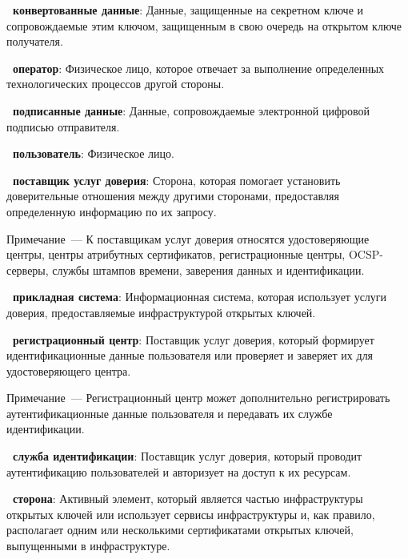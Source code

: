 {\bf \thedefctr~конвертованные данные}:
Данные, защищенные на секретном ключе и сопровождаемые этим ключом, 
защищенным в свою очередь на открытом ключе получателя.  

{\bf \thedefctr~оператор}:
Физическое лицо, которое отвечает за выполнение определенных 
технологических процессов другой стороны.

{\bf \thedefctr~подписанные данные}:
Данные, сопровождаемые электронной цифровой подписью отправителя. 

{\bf\thedefctr~пользователь}: 
Физическое лицо.

{\bf\thedefctr~поставщик услуг доверия}:
Сторона, которая помогает установить доверительные отношения между другими 
сторонами, предоставляя определенную информацию по их запросу.

\begin{note}
Примечание~--- К поставщикам услуг доверия относятся удостоверяющие 
центры, центры атрибутных сертификатов, регистрационные центры, 
OCSP-серверы, службы штампов времени, заверения данных и идентификации.
\end{note}

{\bf\thedefctr~прикладная система}:
Информационная система, которая использует услуги доверия,
предоставляемые инфраструктурой открытых ключей.
%

{\bf\thedefctr~регистрационный центр}: 
Поставщик услуг доверия, который формирует идентификационные данные 
пользователя или проверяет и заверяет их для удостоверяющего центра.

\begin{note}
Примечание~--- Регистрационный центр может дополнительно регистрировать 
аутентификационные данные пользователя и передавать их службе 
идентификации.
\end{note}

{\bf\thedefctr~служба идентификации}: 
Поставщик услуг доверия, который проводит аутентификацию 
пользователей и авторизует на доступ к их ресурсам.
%

{\bf\thedefctr~сторона}: 
Активный элемент, который является 
частью инфраструктуры открытых ключей или использует сервисы 
инфраструктуры и, как правило, располагает одним или несколькими 
сертификатами открытых ключей, выпущенными в инфраструктуре.

